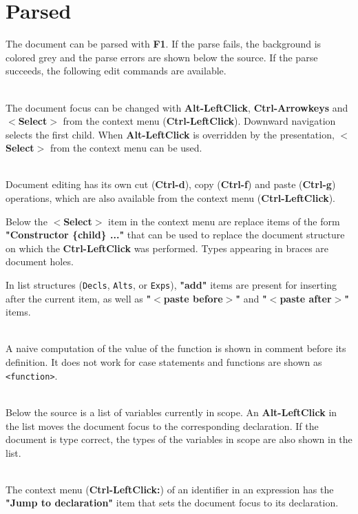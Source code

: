 \documentclass{article}
\begin{document}
\section{Parsed}

The document can be parsed with {\bf F1}. If the parse fails, the background is colored grey and the parse errors are shown below the source. If the parse succeeds, the following edit commands are available.

\bigskip 
{}\\
The document focus can be changed with {\bf Alt-LeftClick}, {\bf Ctrl-Arrowkeys} and {\bf $<$Select$>$} from the context menu ({\bf Ctrl-LeftClick}). Downward navigation selects the first child. When {\bf Alt-LeftClick} is overridden by the presentation, {\bf $<$Select$>$} from the context menu can be used.

\bigskip
{}\\
Document editing has its own cut ({\bf Ctrl-d}), copy ({\bf Ctrl-f}) and paste ({\bf Ctrl-g}) operations, which are also available from the context menu ({\bf Ctrl-LeftClick}). 

Below the {\bf $<$Select$>$} item in the context menu are replace items of the form {\bf "Constructor \{child\} ..."} that can be used to replace the document structure on which the {\bf Ctrl-LeftClick} was performed. Types appearing in braces are document holes.

In list structures (\verb|Decls|, \verb|Alts|, or \verb|Exps|), {\bf "add"} items are present for inserting after the current item, as well as {\bf "$<$paste before$>$"} and {\bf "$<$paste after$>$"} items.

\bigskip 
{}\\
A naive computation of the value of the function is shown in comment before its definition. It does not work for case statements and functions are shown as \verb|<function>|.

\bigskip 
{}\\
Below the source is a list of variables currently in scope. An {\bf Alt-LeftClick} in the list moves the document focus to the corresponding declaration. If the document is type correct, the types of the variables in scope are also shown in the list.

\bigskip 
{}\\
The context menu ({\bf Ctrl-LeftClick:}) of an identifier in an expression has the {\bf "Jump to declaration"} item that sets the document focus to its declaration.
\end{document}
